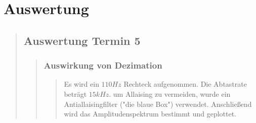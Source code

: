 \section{Auswertung}
\begin{quote}
	\subsection{Auswertung Termin 5}
    \begin{quote}
        \subsubsection{Auswirkung von Dezimation}
		\begin{quote}
			Es wird ein $110Hz$ Rechteck aufgenommen. Die Abtastrate beträgt $15kHz$. um Allaising zu
            vermeiden, wurde ein Antiallaisingfilter ("die blaue Box") verwendet. Anschließend wird das
            Amplitudenspektrum bestimmt und geplottet.\\
        

\end{quote}
\end{quote}
\end{quote}
